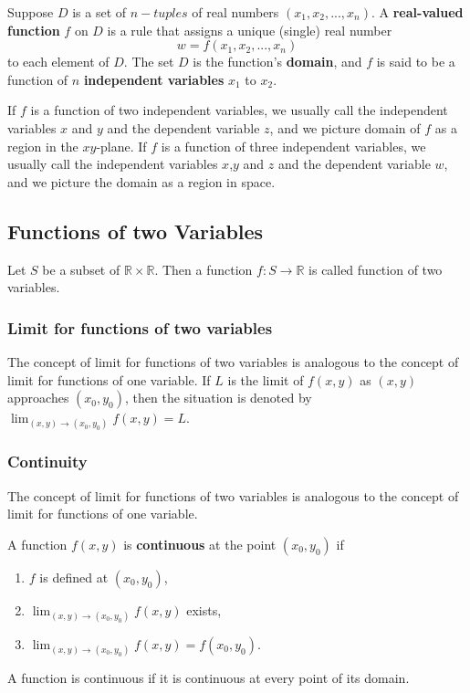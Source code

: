 \documentclass[aima331_lecturenotes_ku.tex]{subfiles}
\begin{document}
\begin{mdframed}
  \begin{definition}
    Suppose \(D\) is a set of \(n-tuples\) of real numbers \((x_1,x_2,...,x_n)\). A \textbf{real-valued function} \(f\) on \(D\) is a rule that assigns a unique (single) real number \[w=f(x_1,x_2,...,x_n)\] to each element of \(D\). The set \(D\) is the function's \textbf{domain}, and \(f\) is said to be a function of \(n\) \textbf{independent variables} \(x_1\) to \(x_2\).
  \end{definition}
\end{mdframed}
If \(f\) is a function of two independent variables, we usually call the independent variables \(x\) and \(y\) and the dependent variable \(z\), and we picture domain of \(f\) as a region in the \(xy\)-plane. If \(f\) is a function of three independent variables, we usually call the independent variables \(x\),\(y\) and \(z\) and the dependent variable \(w\), and we picture the domain as a region in space.

\subsection{Functions of two Variables}
Let \(S\) be a subset of \(\mathbb{R} \times \mathbb{R}\). Then a function \(f: S \to \mathbb{R}\) is called function of two variables.
\subsubsection{Limit for functions of two variables}
The concept of limit for functions of two variables is analogous to the concept of limit for functions of one variable. If \(L\) is the limit of \(f(x,y)\) as \((x,y)\) approaches \((x_0,y_0)\), then the situation is denoted by \(\displaystyle \lim_{(x,y) \to (x_0,y_0)} f(x,y) = L\).
\subsubsection{Continuity}
The concept of limit for functions of two variables is analogous to the concept of limit for functions of one variable.
\begin{mdframed}
  A function \(f(x,y)\) is \textbf{continuous} at the point \((x_0,y_0)\) if
  \begin{enumerate}
  \item \(f\) is defined at \((x_0,y_0)\),
  \item \(\displaystyle \lim_{(x,y) \to (x_0,y_0)} f(x,y)\) exists,
  \item \(\displaystyle \lim_{(x,y) \to (x_0,y_0)} f(x,y) = f(x_0,y_0)\).
  \end{enumerate}
  A function is continuous if it is continuous at every point of its domain.
\end{mdframed}
\end{document}
